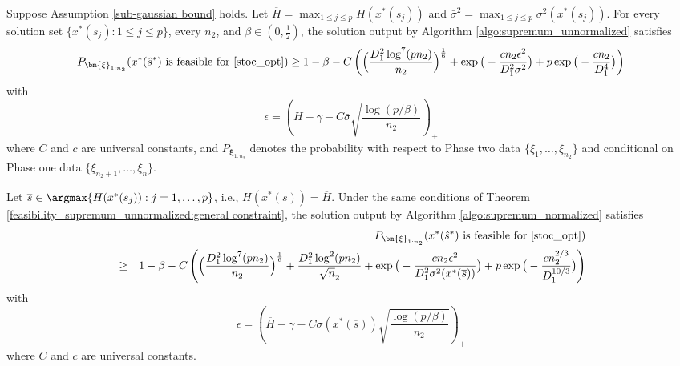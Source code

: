 \documentclass[mnsc,blindrev]{informs4} %
\newcommand{\prth}[1]{\left(#1\right)}
\begin{document}
\begin{theorem}\label{feasibility_supremum_unnormalized:general constraint}
Suppose Assumption \ref{sub-gaussian bound} holds. Let $\overline{H}=\max_{1\leq j\leq p}H(x^*(s_j))$ and $\bar{\sigma}^2=\max_{1\leq j\leq p}\sigma^2(x^*(s_j))$. For every solution set $\{x^*(s_j):1\leq j\leq p\}$, every $n_2$, and $\beta\in(0,\frac{1}{2})$, the solution output by Algorithm \ref{algo:supremum_unnormalized} satisfies
\begin{align*}
P_{\bm{\xi}_{1:n_2}}(x^*(\hat s^*)\text{ is feasible for \eqref{stoc_opt}})\geq 1-\beta-C\prth{\Big(\frac{D_1^2\log^7(pn_2)}{n_2}\Big)^{\frac{1}{6}}+\exp\big(-\frac{cn_2\epsilon^2}{D_1^2\bar{\sigma}^2}\big)+p\exp\big(-\frac{cn_2}{D_1^4}\big)}
\end{align*}
with
\begin{equation}\label{validation accuracy:supremum unnormalized}
    \epsilon = \prth{\overline{H}-\gamma-C\bar{\sigma}\sqrt{\frac{\log(p/\beta)}{n_2}}}_+
\end{equation}
where $C$ and $c$ are universal constants, and $P_{\bm{\xi}_{1:n_2}}$ denotes the probability with respect to Phase two data $\{\xi_1,\ldots,\xi_{n_2}\}$ and conditional on Phase one data $\{\xi_{n_2+1},\ldots,\xi_n\}$.
\end{theorem}
\begin{theorem}\label{feasibility_supremum_normalized:general constraint}
Let $\overline{s}\in\argmax \{H(x^*(s_j)):j=1,\ldots,p\}$, i.e., $H(x^*(\overline{s}))=\overline{H}$. Under the same conditions of Theorem \ref{feasibility_supremum_unnormalized:general constraint}, the solution output by Algorithm \ref{algo:supremum_normalized} satisfies
\begin{eqnarray*}
&&P_{\bm{\xi}_{1:n_2}}(x^*(\hat s^*)\text{ is feasible for \eqref{stoc_opt}})\\
&\geq& 1-\beta-C\prth{\Big(\frac{D_1^2\log^7(pn_2)}{n_2}\Big)^{\frac{1}{6}}+\frac{D_1^2\log^2(pn_2)}{\sqrt n_2}+\exp\big(-\frac{cn_2\epsilon^2}{D_1^2\sigma^2(x^*(\overline{s}))}\big)+p\exp\big(-\frac{cn_2^{2/3}}{D_1^{10/3}}\big)}
\end{eqnarray*}
with
\begin{equation}\label{validation accuracy:supremum normalized}
    \epsilon = \prth{\overline{H}-\gamma-C\sigma(x^*(\overline{s}))\sqrt{\frac{\log(p/\beta)}{n_2}}}_+
\end{equation}
where $C$ and $c$ are universal constants.
\end{theorem}
\end{document}
